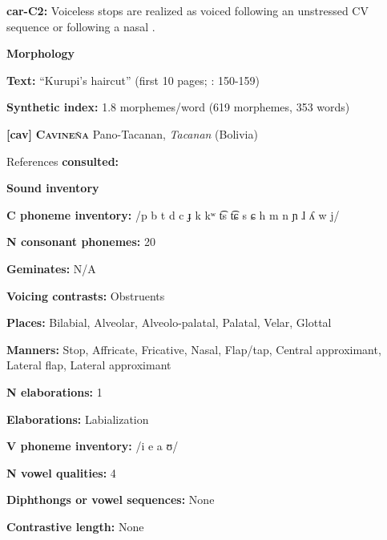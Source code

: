 \textbf{car-C2:} Voiceless stops are realized as voiced following an unstressed CV sequence or following a nasal \citep[31]{Courtz2008}.



\textbf{Morphology}



\textbf{Text:} “Kurupi’s haircut” (first 10 pages; \citealt{Courtz2008}: 150-159)



\textbf{Synthetic index:} 1.8 morphemes/word (619 morphemes, 353 words)



\textbf{[cav]}   \textbf{\textsc{Cavineña}  }  Pano-Tacanan, \textit{Tacanan} (Bolivia)



References \textbf{consulted:} \citet{Guillaume2008}



\textbf{Sound inventory}



\textbf{C phoneme inventory:} /p b t d c ɟ k kʷ t͡s t͡ɕ s ɕ h m n ɲ ɺ ʎ w j/



\textbf{N consonant phonemes:} 20



\textbf{Geminates:} N/A



\textbf{Voicing contrasts:} Obstruents



\textbf{Places:} Bilabial, Alveolar, Alveolo-palatal, Palatal, Velar, Glottal



\textbf{Manners:} Stop, Affricate, Fricative, Nasal, Flap/tap, Central approximant, Lateral flap, Lateral approximant



\textbf{N elaborations:} 1



\textbf{Elaborations:} Labialization



\textbf{V phoneme inventory:} /i e a ʊ/



\textbf{N vowel qualities:} 4



\textbf{Diphthongs or vowel sequences:} None



\textbf{Contrastive length:} None



